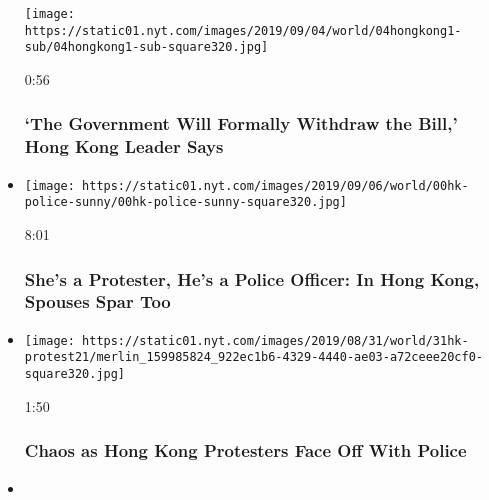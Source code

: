\begin{itemize}
  \texttt{[image: https://static01.nyt.com/images/2019/09/04/world/04hongkong1-sub/04hongkong1-sub-square320.jpg]}

  0:56

  \hypertarget{the-government-will-formally-withdraw-the-bill-hong-kong-leader-says}{%
  \subsubsection{`The Government Will Formally Withdraw the Bill,' Hong
  Kong Leader
  Says}\label{the-government-will-formally-withdraw-the-bill-hong-kong-leader-says}}
\item
  \href{https://www.nytimes.com/video/world/asia/100000006682566/shes-a-protester-hes-a-police-officer-in-hong-kong-spouses-spar-too.html?action=click\&module=video-series-bar\&region=header\&pgtype=Article\&playlistId=video/hk-protest}{}

  \texttt{[image: https://static01.nyt.com/images/2019/09/06/world/00hk-police-sunny/00hk-police-sunny-square320.jpg]}

  8:01

  \hypertarget{shes-a-protester-hes-a-police-officer-in-hong-kong-spouses-spar-too}{%
  \subsubsection{She's a Protester, He's a Police Officer: In Hong Kong,
  Spouses Spar
  Too}\label{shes-a-protester-hes-a-police-officer-in-hong-kong-spouses-spar-too}}
\item
  \href{https://www.nytimes.com/video/world/asia/100000006691745/hong-kong-protest.html?action=click\&module=video-series-bar\&region=header\&pgtype=Article\&playlistId=video/hk-protest}{}

  \texttt{[image: https://static01.nyt.com/images/2019/08/31/world/31hk-protest21/merlin\_159985824\_922ec1b6-4329-4440-ae03-a72ceee20cf0-square320.jpg]}

  1:50

  \hypertarget{chaos-as-hong-kong-protesters-face-off-with-police}{%
  \subsubsection{Chaos as Hong Kong Protesters Face Off With
  Police}\label{chaos-as-hong-kong-protesters-face-off-with-police}}
\item
  \href{https://www.nytimes.com/video/world/asia/100000006689840/hong-kong-activists.html?action=click\&module=video-series-bar\&region=header\&pgtype=Article\&playlistId=video/hk-protest}{}


\end{itemize}
